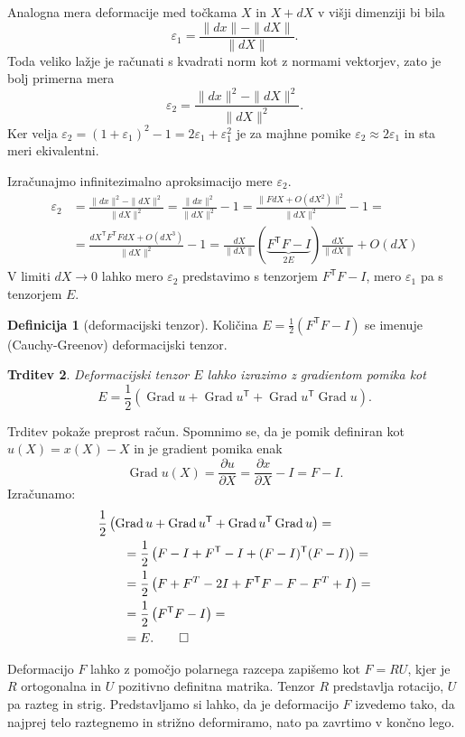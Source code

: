 \documentclass[12pt,a4paper]{article}
\theoremstyle{definition} %
\newtheorem{definicija}{Definicija}[section]
\theoremstyle{plain} %
\newtheorem{trditev}[definicija]{Trditev}
\numberwithin{equation}{section}
\newcommand{\T}{\mathsf{T}}
\newcommand{\Grad}{\operatorname{Grad}}
\newcommand{\eps}{\varepsilon}
\newcommand{\dpar}[2]{\ensuremath{\frac{\partial #1}{\partial #2}}}
\begin{document}
Analogna mera deformacije med točkama $X$ in $X+dX$ v višji dimenziji bi bila
\[
  \eps_1 = \frac{\|dx\| - \|dX\|}{\|dX\|}.
\]
Toda veliko lažje je računati s kvadrati norm kot z normami vektorjev, zato je
bolj primerna mera
\[
  \eps_2 = \frac{\|dx\|^2 - \|dX\|^2}{\|dX\|^2}.
\]
Ker velja $\eps_2 = (1+\eps_1)^2 - 1 = 2\eps_1 + \eps_1^2$ je za majhne pomike
$\eps_2 \approx 2\eps_1$ in sta meri ekivalentni.

Izračunajmo infinitezimalno aproksimacijo mere $\eps_2$.
\begin{align*}
  \eps_2 &=
  \frac{\|dx\|^2 - \|dX\|^2}{\|dX\|^2} =
  \frac{\|dx\|^2}{\|dX\|^2}  - 1=
  \frac{\|F dX + O(dX^2)\|^2}{\|dX\|^2} - 1 = \\ &=
  \frac{dX^\T F^\T F dX + O(dX^3)}{\|dX\|^2} - 1 =
  \frac{dX}{\|dX\|}(\underbrace{F^\T F - I}_{2E})\frac{dX}{\|dX\|} + O(dX)
\end{align*}
V limiti $dX \to 0$ lahko mero $\eps_2$ predstavimo s tenzorjem $F^\T F- I$,
mero $\eps_1$ pa s tenzorjem $E$.

\begin{definicija}[deformacijski tenzor]
  Količina $E = \frac12 (F^\T F - I)$ se imenuje (Cauchy-Greenov)
  deformacijski tenzor.
\end{definicija}
\begin{trditev}
  Deformacijski tenzor $E$ lahko izrazimo z gradientom pomika kot
  \[ E = \frac12\left( \Grad u + \Grad u^\T + \Grad u^\T \Grad u \right). \]
\end{trditev}
\proof
Trditev pokaže preprost račun. Spomnimo se, da je pomik definiran kot $u(X) =
x(X) - X$ in je gradient pomika enak
\[
  \Grad u(X) = \dpar{u}{X} = \dpar{x}{X} - I = F - I.
\]
Izračunamo:
\begin{align*}
  &\frac12\left( \Grad u + \Grad u^\T + \Grad u^\T \Grad u \right) = \\
  &\qquad=\frac12\left(F - I + F^\T - I  + (F-I)^\T(F-I)\right) = \\
  &\qquad=\frac12\left(F + F^T - 2I + F^\T F - F - F^T + I\right) = \\
  &\qquad=\frac12\left(F^\T F - I\right) = \\
  &\qquad=E.\qedhere
\end{align*}
\endproof

Deformacijo $F$ lahko z pomočjo polarnega razcepa zapišemo kot $F = RU$, kjer je
$R$ ortogonalna in $U$ pozitivno definitna matrika. Tenzor $R$ predstavlja
rotacijo, $U$ pa razteg in strig. Predstavljamo si lahko, da je deformacijo $F$
izvedemo tako, da najprej telo raztegnemo in strižno deformiramo, nato pa
zavrtimo v končno lego.
\end{document}
